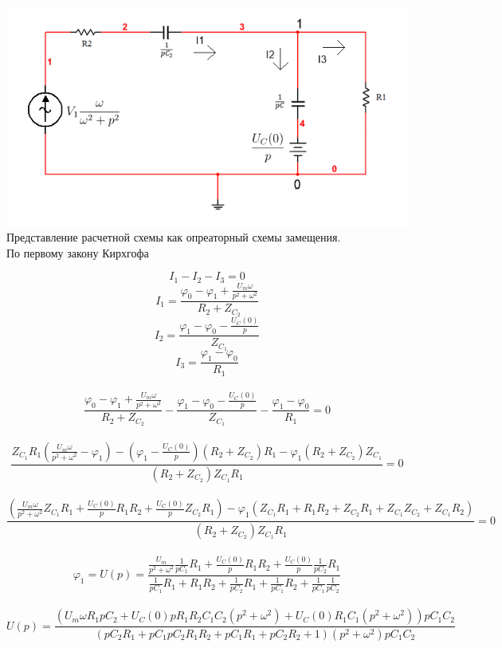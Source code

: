 \documentclass[12pt, a4paper]{report}
\begin{document}
    \begin{center}
        \includegraphics[scale = 0.8]{photo1.png}\\
        Представление расчетной схемы как опреаторный схемы замещения.\\
        \bigskip\bigskip\bigskip
        По первому закону Кирхгофа
    \end{center}
    \[ I_1 - I_2 - I_3 = 0 \]
    \[ I_1 = \frac{\varphi_0 - \varphi_1 + \frac{U_{m}\omega}{p^2 + \omega^2} } {R_2 + Z_{C_2}} \]
    \[ I_2 = \frac{ \varphi_1 - \varphi_0 - \frac{U_{C}(0)}{p} } {Z_{C_1}} \]
    \[ I_3 = \frac{\varphi_1 - \varphi_0}{R_1} \]\\
    \[ \frac{\varphi_0 - \varphi_1 + \frac{U_{m}\omega}{p^2 + \omega^2}}{R_2 + Z_{C_2}} - \frac{\varphi_1 - \varphi_0 - \frac{U_{C}(0)}p}{Z_{C_1}} - \frac{\varphi_1 - \varphi_0}{R_1} = 0 \]\\
    \[ \frac{Z_{C_1}R_1 \left( \frac{U_{m}\omega}{p^2 + \omega^2} - \varphi_1 \right) - \left( \varphi_1 - \frac{U_{C}(0)}{p} \right) \left( R_2 + Z_{C_2} \right)R_1 - \varphi_{1}\left( R_2 + Z_{C_2} \right)Z_{C_1}} {\left( R_2 + Z_{C_2} \right)Z_{C_1}R_1} = 0\]\\
    \[ \frac{\left( \frac{U_{m}\omega}{p^2 + \omega^2}Z_{C_1}R_1 + \frac{U_{C}(0)}{p}R_{1}R_2 + \frac{U_{C}(0)}{p}Z_{C_2}R_1  \right) - \varphi_{1}\left( Z_{C_1}R_1 + R_{1}R_2 + Z_{C_2}R_1 + Z_{C_1}Z_{C_2} + Z_{C_1}R_2 \right) } {\left( R_2 + Z_{C_2} \right)Z_{C_1}R_1} = 0 \]\\
    \[ \varphi_1 = U(p) = \frac{ \frac{U_{m}}{p^2 + \omega^2} \frac{1}{pC_1}R_1 + \frac{U_{C}(0)}{p}R_{1}R_2 + \frac{U_{C}(0)}{p}\frac{1}{pC_2}R_1 } {\frac{1}{pC_1}R_1 + R_{1}R_2 + \frac{1}{pC_2}R_1 + \frac{1}{pC_1}R_2 + \frac{1}{pC_1}\frac{1}{pC_2} } \]\\
    \[ U(p) = \frac{ \left( U_{m}\omega R_{1}pC_2 + U_{C}(0)pR_{1}R_{2}C_{1}C_{2}(p^2 + \omega^2) + U_{C}(0)R_{1}C_{1}(p^2 + \omega^2) \right)pC_{1}C_{2} } { ( pC_{2}R_{1} + pC_{1}pC_{2}R_{1}R_{2} + pC_{1}R_{1} + pC_{2}R_{2} + 1)(p^2 + \omega^2)pC_{1}C_{2} } \]
\end{document}
